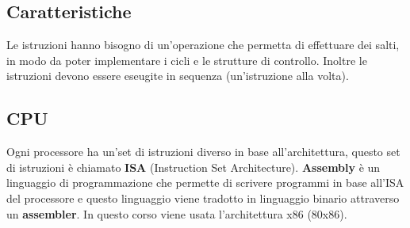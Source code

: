 \documentclass[a4paper]{article}
\theoremstyle{break}
\theoremstyle{break}
\theoremstyle{break}
\theoremstyle{break}
\begin{document}
\subsection{Caratteristiche}
Le istruzioni hanno bisogno di un'operazione che permetta di effettuare dei salti,
in modo da poter implementare i cicli e le strutture di controllo. Inoltre le istruzioni
devono essere eseugite in sequenza (un'istruzione alla volta).

\subsection{CPU}
Ogni processore ha un'set di istruzioni diverso in base all'architettura,
questo set di istruzioni è chiamato \textbf{ISA} (Instruction Set Architecture).
\textbf{Assembly} è un linguaggio di programmazione che permette di scrivere programmi
in base all'ISA del processore e questo linguaggio viene tradotto in linguaggio binario
attraverso un \textbf{assembler}. In questo corso viene usata l'architettura x86 (80x86).
\end{document}
